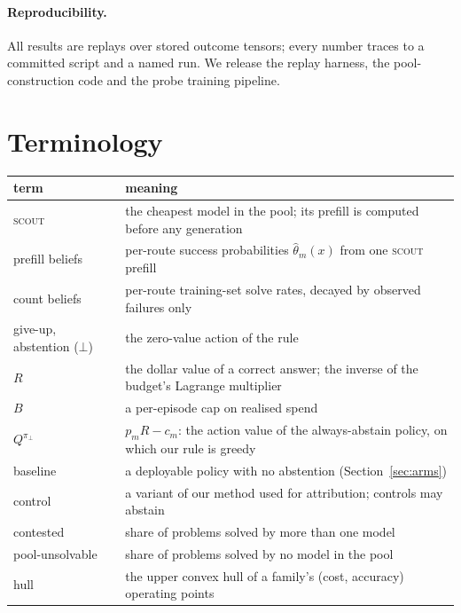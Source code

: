 \documentclass[10pt]{article} %
\newcommand{\scout}{\textsc{scout}\xspace}
\newcommand{\abst}{\bot}
\begin{document}
\paragraph{Reproducibility.}
All results are replays over stored outcome tensors; every number traces to a committed script
and a named run.  We release the replay harness, the pool-construction code and the probe
training pipeline.




\appendix

\section{Terminology}
\label{app:terminology}

\begin{center}
\small
\begin{tabular}{lp{10.8cm}}
\toprule
term & meaning \\
\midrule
\scout & the cheapest model in the pool; its prefill is computed before any generation \\
prefill beliefs & per-route success probabilities $\hat\theta_m(x)$ from one \scout prefill \\
count beliefs & per-route training-set solve rates, decayed by observed failures only \\
give-up, abstention ($\abst$) & the zero-value action of the rule \\
$R$ & the dollar value of a correct answer; the inverse of the budget's Lagrange multiplier \\
$B$ & a per-episode cap on realised spend \\
$Q^{\pi_\abst}$ & $p_mR-c_m$: the action value of the always-abstain policy, on which our rule is greedy \\
baseline & a deployable policy with no abstention (Section~\ref{sec:arms}) \\
control & a variant of our method used for attribution; controls may abstain \\
contested & share of problems solved by more than one model \\
pool-unsolvable & share of problems solved by no model in the pool \\
hull & the upper convex hull of a family's (cost, accuracy) operating points \\
\bottomrule
\end{tabular}
\end{center}
\end{document}
